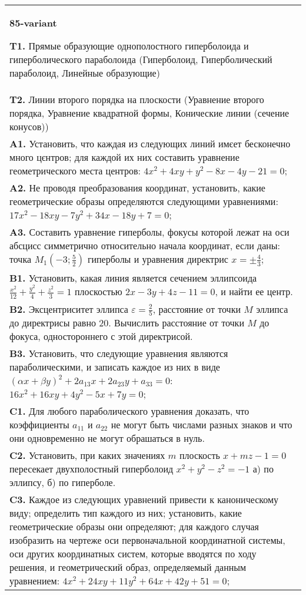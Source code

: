 \documentclass{article}
\begin{document}
\begin{tabular}{m{17cm}}
\textbf{85-variant}
\newline

\textbf{T1.} Прямые образующие однополостного гиперболоида и гиперболического параболоида (Гиперболоид, Гиперболический параболоид, Линейные образующие) \\
\textbf{T2.} Линии второго порядка на плоскости (Уравнение второго порядка, Уравнение квадратной формы, Конические линии (сечение конусов)) \\
\textbf{A1.} Установить, что каждая из следующих линий имєет бесконечно много цєнтров; для каждой их них составить уравнение геометрического места центров: $4 x^2+4 x y+y^2-8 x-4 y-21=0$; \\
\textbf{A2.} Не проводя преобразования координат, установить, какие геометрические образы определяются следующими уравнениями: $17 x^2-18 x y-7 y^2+34 x-18 y+7=0$; \\
\textbf{A3.} Составить уравнение гиперболы, фокусы которой лежат на оси абсцисс симметрично относительно начала координат, если даны: точка $M_1\left(-3 ; \frac{5}{2}\right)$ гиперболы и уравнения директрис $x= \pm \frac{4}{3}$; \\
\textbf{B1.} Установить, какая линия является сечением эллипсоида $\frac{x^2}{12}+\frac{y^2}{4}+\frac{z^2}{3}=1$ плоскостью $2 x-3 y+4 z-11=0$, и найти ее центр. \\
\textbf{B2.} Эксцентриситет эллипса $\varepsilon=\frac{2}{5}$, расстояние от точки $M$ эллипса до директрисы равно 20. Вычислить расстояние от точки $M$ до фокуса, одностороннего с этой директрисой. \\
\textbf{B3.} Установить, что следующие уравнения являются параболическими, и записать каждое из них в виде $(\alpha x+\beta y)^2+2 a_{13} x+2 a_{23} y+a_{33}=0$: $16 x^2+16 x y+4 y^2-5 x+7 y=0$; \\
\textbf{C1.} Для любого параболического уравнения доказать, что коэффициенты $a_{11}$ и $a_{22}$ не могут быть числами разных знаков и что они одновременно не могут обрашаться в нуль. \\
\textbf{C2.} Установить, при каких значениях $m$ плоскость $x+m z-1=0$ пересекает двухполостный гиперболоид $x^2+y^2-z^2=-1$ а) по эллипсу, б) по гиперболе. \\
\textbf{C3.} Каждое из следующих уравнений привести к каноническому виду; определить тип каждого из них; установить, какие геометрические образы они определяют; для каждого случая изобразить на чертеже оси первоначальной координатной системы, оси других координатных систем, которые вводятся по ходу решения, и геометрический образ, определяемый данным уравнением: $4 x^2+24 x y+11 y^2+64 x+42 y+51=0$; \\

\end{tabular}
\vspace{1cm}
\end{document}
